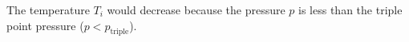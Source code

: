 The temperature \( T_i \) would decrease because the pressure \( p \) is less than the triple point pressure (\( p < p_{\text{triple}} \)).
